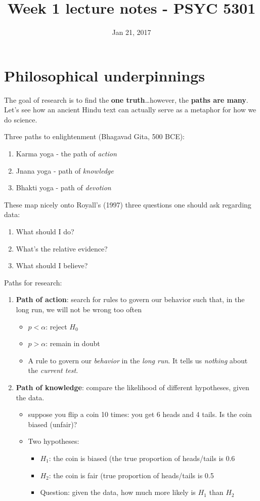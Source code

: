 \documentclass[11pt]{article}
\date{Jan 21, 2017}
\title{Week 1 lecture notes - PSYC 5301}
\begin{document}
\maketitle


\section*{Philosophical underpinnings}
\label{sec-1}
The goal of research is to find the \textbf{one truth}\ldots{}however, the \textbf{paths are many}.  Let's see how an ancient Hindu text can actually serve as a metaphor for how we do science.

Three paths to enlightenment (Bhagavad Gita, 500 BCE):
\begin{enumerate}
\item Karma yoga - the path of \emph{action}
\item Jnana yoga - path of \emph{knowledge}
\item Bhakti yoga - path of \emph{devotion}
\end{enumerate}

These map nicely onto Royall's (1997) three questions one should ask regarding data:
\begin{enumerate}
\item What should I do?
\item What's the relative evidence?
\item What should I believe?
\end{enumerate}

Paths for research:
\begin{enumerate}
\item \textbf{Path of action}: search for rules to govern our behavior such that, in the long run, we will not be wrong too often
\begin{itemize}
\item $p < \alpha$: reject $H_0$
\item $p > \alpha$: remain in doubt
\item A rule to govern our \emph{behavior} in the \emph{long run}.  It tells us \emph{nothing} about the \emph{current test}.
\end{itemize}

\item \textbf{Path of knowledge}:  compare the likelihood of different hypotheses, given the data.
\begin{itemize}
\item suppose you flip a coin 10 times: you get 6 heads and 4 tails.  Is the coin biased (unfair)?
\item Two hypotheses: 
\begin{itemize}
\item $H_1$: the coin is biased (the true proportion of heads/tails is 0.6
\item $H_2$: the coin is fair (true proportion of heads/tails is 0.5
\item Question: given the data, how much more likely is $H_1$ than $H_2$
\end{itemize}
\end{itemize}
\end{enumerate}
\end{document}
